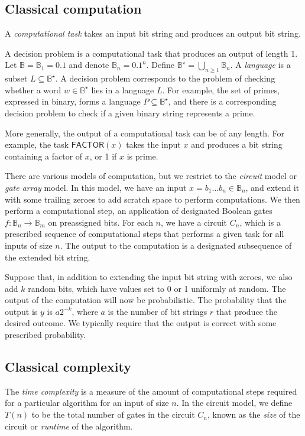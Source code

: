 \subsection{Classical computation}
A \emph{computational task} takes an input bit string and produces an output bit string.

A decision problem is a computational task that produces an output of length 1.
Let \( \mathbb B = \mathbb B_1 = \qty{0,1} \) and denote \( \mathbb B_n = \qty{0,1}^n \).
Define \( \mathbb B^\star = \bigcup_{n \geq 1} \mathbb B_n \).
A \emph{language} is a subset \( L \subseteq \mathbb B^\star \).
A decision problem corresponds to the problem of checking whether a word \( w \in \mathbb B^\star \) lies in a language \( L \).
For example, the set of primes, expressed in binary, forms a language \( P \subseteq \mathbb B^\star \), and there is a corresponding decision problem to check if a given binary string represents a prime.

More generally, the output of a computational task can be of any length.
For example, the task \( \mathsf{FACTOR}(x) \) takes the input \( x \) and produces a bit string containing a factor of \( x \), or 1 if \( x \) is prime.

There are various models of computation, but we restrict to the \emph{circuit} model or \emph{gate array} model.
In this model, we have an input \( x = b_1 \dots b_n \in \mathbb B_n \), and extend it with some trailing zeroes to add scratch space to perform computations.
We then perform a computational step, an application of designated Boolean gates \( f \colon \mathbb B_n \to \mathbb B_m \) on preassigned bits.
For each \( n \), we have a circuit \( C_n \), which is a prescribed sequence of computational steps that performs a given task for all inputs of size \( n \).
The output to the computation is a designated subsequence of the extended bit string.

Suppose that, in addition to extending the input bit string with zeroes, we also add \( k \) random bits, which have values set to 0 or 1 uniformly at random.
The output of the computation will now be probabilistic.
The probability that the output is \( y \) is \( a2^{-k} \), where \( a \) is the number of bit strings \( r \) that produce the desired outcome.
We typically require that the output is correct with some prescribed probability.

\subsection{Classical complexity}
The \emph{time complexity} is a measure of the amount of computational steps required for a particular algorithm for an input of size \( n \).
In the circuit model, we define \( T(n) \) to be the total number of gates in the circuit \( C_n \), known as the \emph{size} of the circuit or \emph{runtime} of the algorithm.

